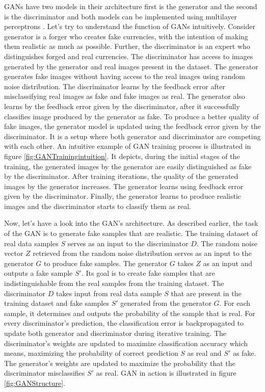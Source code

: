 \acp{GAN} have two models in their architecture first is the generator and the second is the discriminator and both models can be implemented using multilayer perceptrons \cite{goodfellow2014generative}. Let's try to understand the function of \acp{GAN} intuitively. Consider generator is a forger who creates fake currencies, with the intention of making them realistic as much as possible. Further, the discriminator is an expert who distinguishes forged and real currencies. The discriminator has access to images generated by the generator and real images present in the dataset. The generator generates fake images without having access to the real images using random noise distribution. The discriminator learns by the feedback error after misclassifying real images as fake and fake images as real. The generator also learns by the feedback error given by the discriminator, after it successfully classifies image produced by the generator as fake. To produce a better quality of fake images, the generator model is updated using the feedback error given by the discriminator. It is a setup where both generator and discriminator are competing with each other. An intuitive example of \ac{GAN} training process is illustrated in figure \ref{fig:GANTrainingintuition}. It depicts, during the initial stages of the training, the generated images by the generator are easily distinguished as fake by the discriminator. After training iterations, the quality of the generated images by the generator increases. The generator learns using feedback error given by the discriminator. Finally, the generator learns to produce realistic images and the discriminator starts to classify them as real.

Now, let's have a look into the \ac{GAN}'s architecture. As described earlier, the task of the \ac{GAN} is to generate fake samples that are realistic. The training dataset of real data samples $S$ serves as an input to the discriminator $D$. The random noise vector $Z$ retrieved from the random noise distribution serves as an input to the generator $G$ to produce fake samples. The generator $G$ takes $Z$ as an input and outputs a fake sample $S'$. Its goal is to create fake samples that are indistinguishable from the real samples from the training dataset. The discriminator $D$ takes input from real data sample $S$ that are present in the training dataset and fake samples $S'$ generated from the generator $G$. For each sample, it determines and outputs the probability of the sample that is real. For every discriminator's prediction, the classification error is backpropagated to update both generator and discriminator during iterative training. The discriminator's weights are updated to maximize classification accuracy which means, maximizing the probability of correct prediction $S$ as real and $S'$ as fake. The generator's weights are updated to maximize the probability that the discriminator misclassifies $S'$ as real. \ac{GAN} in action is illustrated in figure \ref{fig:GANStructure}.


